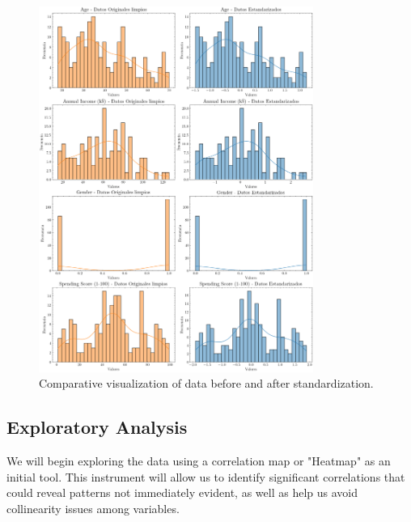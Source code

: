 \documentclass[10pt]{article}
\begin{document}
\begin{figure}[p]
    \centering
    \includegraphics[width=0.8\textwidth]{plots_investing/Grafico 2.png}
    \caption{Comparative visualization of data before and after standardization.}
    \label{fig:miGrafico2}
\end{figure}



\subsection{Exploratory Analysis}

We will begin exploring the data using a correlation map or "Heatmap" as an initial tool. This instrument will allow us to identify significant correlations that could reveal patterns not immediately evident, as well as help us avoid collinearity issues among variables.
\end{document}
